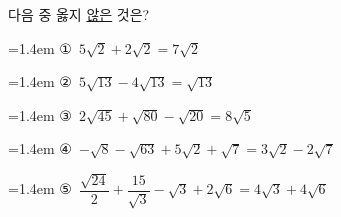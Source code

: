 다음 중 옳지 \underline{않은} 것은?
\par\medskip\par\noindent\hangindent=1.4em {\small ①}\ $5\sqrt{2}+2\sqrt{2}=7\sqrt{2}$\par\noindent\hangindent=1.4em {\small ②}\ $5\sqrt{13}-4\sqrt{13}=\sqrt{13}$\par\noindent\hangindent=1.4em {\small ③}\ $2\sqrt{45}+\sqrt{80}-\sqrt{20}=8\sqrt{5}$\par\noindent\hangindent=1.4em {\small ④}\ $-\sqrt{8}-\sqrt{63}+5\sqrt{2}+\sqrt{7}=3\sqrt{2}-2\sqrt{7}$\par\noindent\hangindent=1.4em {\small ⑤}\ $\dfrac{\sqrt{24}}{2}+\dfrac{15}{\sqrt{3}}-\sqrt{3}+2\sqrt{6}=4\sqrt{3}+4\sqrt{6}$\par\medskip
